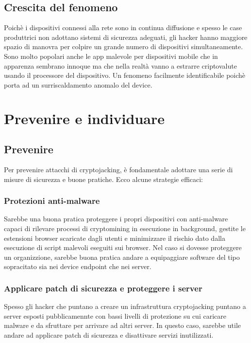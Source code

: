 \documentclass[12pt,a4paper]{article}
\begin{document}
\subsection{Crescita del fenomeno}
Poichè i dispositivi connessi alla rete sono in continua diffusione e spesso le
case produttrici non adottano sistemi di sicurezza adeguati, gli hacker hanno
maggiore spazio di manovra per colpire un grande numero di dispositivi
simultaneamente. Sono molto popolari anche le app malevole per dispositivi
mobile che in apparenza sembrano innoque ma che nella realtà vanno a estrarre
criptovalute usando il processore del dispositivo. Un fenomeno facilmente
identificabile poichè porta ad un surriscaldamento anomalo del device.

\newpage

\section{Prevenire e individuare}

\subsection{Prevenire}
Per prevenire attacchi di cryptojacking, è fondamentale adottare una serie di
misure di sicurezza e buone pratiche. Ecco alcune strategie efficaci:

\subsubsection{Protezioni anti-malware}
Sarebbe una buona pratica proteggere i propri dispositivi con anti-malware
capaci di rilevare processi di cryptomining in esecuzione in background, gestite
le estensioni browser scaricate dagli utenti e minimizzare il rischio dato dalla
esecuzione di script malevoli eseguiti sui browser. Nel caso si dovesse
proteggere un organizzione, sarebbe buona pratica andare a equipaggiare software
del tipo sopracitato sia nei device endpoint che nei server.

\subsubsection{Applicare patch di sicurezza e proteggere i server}
Spesso gli hacker che puntano a creare un infrastruttura cryptojacking puntano a
server esposti pubblicamennte con bassi livelli di protezione su cui caricare
malware e da sfruttare per arrivare ad altri server. In questo caso, sarebbe
utile andare ad applicare patch di sicurezza e disattivare servizi inutilizzati.
\end{document}
